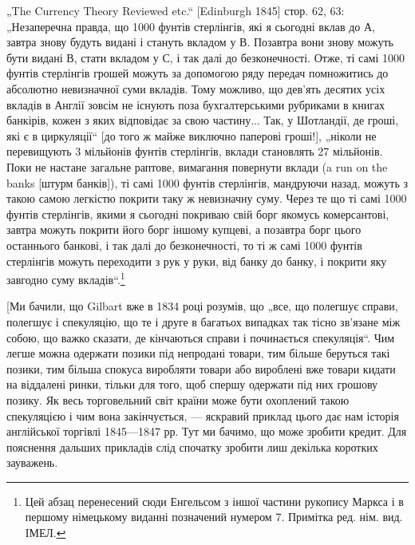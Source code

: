 „The Currency Theory Reviewed etc.“ [Edinburgh 1845] стор. 62, 63: „Незаперечна правда, що 1000
фунтів стерлінгів, які я сьогодні вклав до А, завтра
знову будуть видані і стануть вкладом у В. Позавтра вони знову можуть бути
видані В, стати вкладом у С, і так далі до безконечності. Отже, ті самі
1000 фунтів стерлінгів грошей можуть за допомогою ряду передач помножитись до абсолютно невизначної
суми вкладів. Тому можливо, що дев’ять десятих усіх вкладів в Англії зовсім не існують поза
бухгалтерськими рубриками
в книгах банкірів, кожен з яких відповідає за свою частину... Так, у Шотландії, де гроші, які є в
циркуляції“ [до того ж майже виключно паперові гроші!],
„ніколи не перевищують 3 мільйонів фунтів стерлінгів, вклади становлять 27 мільйонів.
Поки не настане загальне раптове, вимагання повернути вклади (a run
on the banks [штурм банків]), ті самі 1000 фунтів стерлінгів, мандруючи
назад, можуть з такою самою легкістю покрити таку ж невизначну суму.
Через те що ті самі 1000 фунтів стерлінгів, якими я сьогодні покриваю свій
борг якомусь комерсантові, завтра можуть покрити його борг іншому купцеві,
а позавтра борг цього останнього банкові, і так далі до безконечності, то ті ж
самі 1000 фунтів стерлінгів можуть переходити з рук у руки, від банку до
банку, і покрити яку завгодно суму вкладів“.\footnote*{
Цей абзац перенесений сюди Енгельсом з іншої частини рукопису Маркса і в першому німецькому
виданні позначений нумером 7. Примітка ред. нім. вид. ІМЕЛ.
}

[Ми бачили, що Gilbart вже в 1834 році розумів, що „все,
що полегшує справи, полегшує і спекуляцію, що те і друге
в багатьох випадках так тісно зв’язане між собою, що важко
сказати, де кінчаються справи і починається спекуляція“. Чим
легше можна одержати позики під непродані товари, тим більше
беруться такі позики, тим більша спокуса виробляти товари або
вироблені вже товари кидати на віддалені ринки, тільки для того,
щоб спершу одержати під них грошову позику. Як весь торговельний світ країни може бути охоплений
такою спекуляцією
і чим вона закінчується, — яскравий приклад цього дає нам історія
англійської торгівлі 1845—1847 рр. Тут ми бачимо, що може зробити кредит. Для пояснення дальших
прикладів слід спочатку
зробити лиш декілька коротких зауважень.

